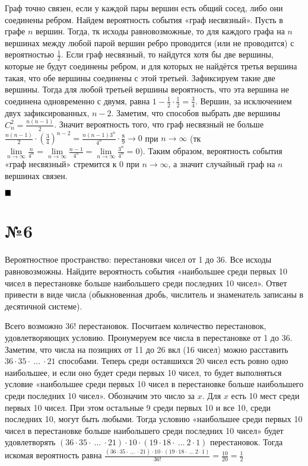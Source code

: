 \documentclass[a4paper, 16pt]{article}
\renewcommand{\inf}{\infty}
\newenvironment{proof}[1][Доказательство]{%
	\begin{trivlist}
		\item[\hskip \labelsep {\bfseries #1:}]
		\item \hspace{14pt}
	}{
		$ \hfill\blacksquare $
	\end{trivlist}
	\hfill\break
}
\newenvironment{solution}[1][Решение]{%
	\begin{trivlist}
		\item[\hskip \labelsep {\bfseries #1:}]
		\item \hspace{15pt}
	}{
	\end{trivlist}
}
\begin{document}
\begin{proof}
			Граф точно связен, если у каждой пары вершин есть общий сосед, либо они соединены ребром. Найдем вероятность события «граф несвязный». Пусть в графе $n$ вершин. Тогда, тк исходы равновозможные, то для каждого графа на $n$ вершинах между любой парой вершин ребро проводится (или не проводится) с вероятностью $\frac{1}{2}$. Если граф несвязный, то найдутся хотя бы две вершины, которые не будут соединены ребром, и для которых не найдётся третья вершина такая, что обе вершины соединены с этой третьей. Зафиксируем такие две вершины. Тогда для любой третьей вершины вероятность, что эта вершина не соединена одновременно с двумя, равна $1 - \frac{1}{2} \cdot \frac{1}{2} = \frac{3}{4}$. Вершин, за исключением двух зафиксированных, $n - 2$. Заметим, что способов выбрать две вершины $C_n^2 = \frac{n(n-1)}{2}$. Значит вероятность того, что граф несвязный не больше $\frac{n(n-1)}{2} \cdot (\frac{3}{4})^{n-2} = \frac{n(n-1)3^n}{4^n} \cdot \frac{8}{9} \to 0$ при $n \to \inf$ (тк $\lim\limits_{n \to \inf} \frac{n}{4^n} = \lim\limits_{n \to \inf} \frac{n - 1}{4^n} = \lim\limits_{n \to \inf} \frac{3^n}{4^n} = 0$). Таким образом, вероятность события «граф несвязный» стремится к 0 при $n \to \inf$, а значит случайный граф на $n$ вершинах связен.
		\end{proof}
	
	\section*{№6}
	
		Вероятностное пространство: перестановки чисел от 1 до 36. Все исходы равновозможны. Найдите
		вероятность события «наибольшее среди первых 10 чисел в перестановке больше наибольшего среди
		последних 10 чисел». Ответ привести в виде числа (обыкновенная дробь, числитель и знаменатель
		записаны в десятичной системе).
		
		\begin{solution}
			Всего возможно 36! перестановок. Посчитаем количество перестановок, удовлетворяющих условию. Пронумеруем все числа в перестановке от 1 до 36. Заметим, что числа на позициях от 11 до 26 вкл (16 чисел) можно расставить $36 \cdot 35 \cdot \ \dots \ \cdot 21$ способами. Теперь среди оставшихся 20 чисел есть ровно одно наибольшее, и если оно будет среди первых 10 чисел, то будет выполняться условие «наибольшее среди первых 10 чисел в перестановке больше наибольшего среди
			последних 10 чисел». Обозначим это число за $x$. Для $x$ есть 10 мест среди первых 10 чисел. При этом остальные 9 среди первых 10 и все 10, среди последних 10, могут быть любыми. Тогда условию «наибольшее среди первых 10 чисел в перестановке больше наибольшего среди
			последних 10 чисел» будет удовлетворять $(36 \cdot 35 \cdot \ \dots \ \cdot 21) \cdot 10 \cdot (19 \cdot 18 \cdot \ \dots \ 2 \cdot 1)$ перестановок. Тогда искомая вероятность равна $\frac{(36 \cdot 35 \cdot \ \dots \ \cdot 21) \cdot 10 \cdot (19 \cdot 18 \cdot \ \dots \ 2 \cdot 1)}{36!} = \frac{10}{20} = \frac{1}{2}$
		\end{solution}
	
\end{document}
